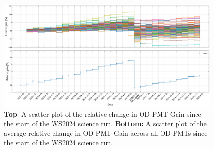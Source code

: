 \begin{figure}[ht!]
    \centering
    \includegraphics[width=\textwidth]{figures/ODCommissioning/RelativegainOverTime_AllPMTs_Both_Full_WS2024.pdf}
    \caption{\textbf{Top:} A scatter plot of the relative change in OD PMT Gain since the start of the WS2024 science run. \textbf{Bottom:} A scatter plot of the average relative change in OD PMT Gain across all OD PMTs since the start of the WS2024 science run.}
    \label{fig:ODCommissioning/RelativeGain_WS2024}
\end{figure}
\iffalse
